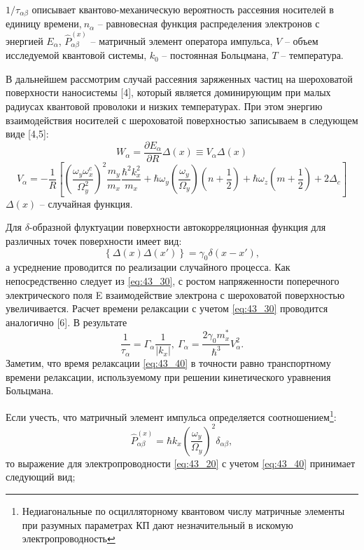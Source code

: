 ${1}/{{\tau }_{\alpha \beta }}$ описывает квантово-механическую вероятность рассеяния носителей в единицу времени,$\ n_{\alpha }$ -- равновесная функция распределения электронов с энергией $E_{\alpha }$, ${\hat{P}}^{\left(x\right)}_{\alpha \beta }$ -- матричный элемент оператора импульса, $V$ -- объем исследуемой квантовой системы, $k_0$ --  постоянная Больцмана, $T$ --  температура.

В дальнейшем рассмотрим случай рассеяния заряженных частиц на шероховатой поверхности наносистемы [4],  который является доминирующим при малых радиусах квантовой проволоки и низких температурах. При этом энергию взаимодействия носителей с шероховатой поверхностью записываем в следующем виде [4,5]:
\begin{equation} \label{eq:43_30} 
W_{\alpha }=\frac{\partial E_{\alpha }}{\partial R}\Delta \left(x\right)\equiv V_{\alpha }\Delta \left(x\right) 
\end{equation}
\[
V_{\alpha }=-\frac{1}{R}\left[{\left(\frac{{\omega }_y{\omega }^c_x}{{\Omega }^2_y}\right)}^2\frac{m_y}{m_x}\frac{{\hbar }^2k^2_x}{m_x}+\hbar {\omega }_y\left(\frac{{\omega }_y}{{\Omega }_y}\right)\left(n+\frac{1}{2}\right)+\hbar {\omega }_z\left(m+\frac{1}{2}\right)+2{\Delta }_c\right]
\] 
$\Delta \left(x\right)$ -- случайная функция.

Для $\delta $-образной флуктуации поверхности автокорреляционная функция для различных точек поверхности имеет вид:
\[
\left\{\Delta \left(x\right)\Delta \left(x'\right)\right\}={\gamma }_0\delta \left(x-x'\right),
\] 
а усреднение проводится по реализации случайного процесса.  Как непосредственно следует из \eqref{eq:43_30}, с ростом напряженности поперечного электрического поля E взаимодействие электрона с шероховатой поверхностью увеличивается. Расчет времени релаксации с учетом \eqref{eq:43_30} проводится аналогично [6]. В результате
\begin{equation} \label{eq:43_40} 
\frac{1}{{\tau }_{\alpha }}={\Gamma }_{\alpha }\frac{1}{\left|k_x\right|},\ {\Gamma }_{\alpha }=\frac{2{\gamma }_0m^*_x}{{\hbar }^3}V^2_{\alpha }.  
\end{equation}
Заметим, что время релаксации \eqref{eq:43_40} в точности равно транспортному времени релаксации, используемому при решении кинетического уравнения Больцмана.

Если учесть, что матричный элемент импульса определяется соотношением\footnote{Недиагональные по осцилляторному квантовом числу матричные элементы при разумных параметрах КП дают незначительный в искомую электропроводность}:
\[
{\hat{P}}^{\left(x\right)}_{\alpha \beta }=\hbar k_x{\left(\frac{{\omega }_y}{{\Omega }_y}\right)}^2{\delta }_{\alpha \beta },
\] 
то выражение для электропроводности \eqref{eq:43_20} с учетом \eqref{eq:43_40} принимает следующий вид;

